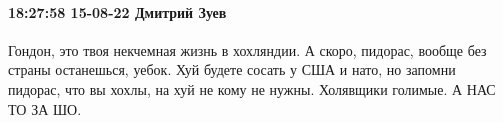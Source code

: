  
 
 
 
 

\paragraph{18:27:58 15-08-22 Дмитрий Зуев}

Гондон, это твоя некчемная жизнь в хохляндии. А скоро, пидорас, вообще без
страны останешься, уебок. Хуй будете сосать у США и нато, но запомни пидорас,
что вы хохлы, на хуй не кому не нужны. Холявщики голимые. А НАС ТО ЗА ШО.
